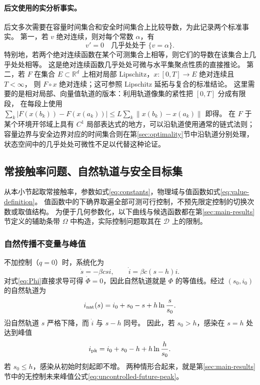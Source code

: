 \documentclass[11pt,a4paper,UTF8]{ctexart}
\theoremstyle{definition}
\newcommand{\R}{\mathbb R}
\newcommand{\Dcal}{\mathcal D}
\begin{document}
\paragraph{后文使用的实分析事实。}
后文多次需要在容量时间集合和安全时间集合上比较导数，为此记录两个标准事实。
第一，若 $v$ 绝对连续，则对每个常数 $\alpha$，有
\begin{equation}
 v'=0\quad\text{几乎处处于 }\{v=\alpha\}.
 \label{eq:ac-level-set}
\end{equation}
特别地，若两个绝对连续函数在某个可测集合上相等，则它们的导数在该集合上几乎处处相等。
这是绝对连续函数几乎处处可微与水平集聚点性质的直接推论\citep[\S222K、\S225C(b)]{Fremlin2001Volume2}。
第二，若 $F$ 在集合 $E\subset\R^d$ 上相对局部 Lipschitz，$x:[0,T]\to E$ 绝对连续且 $T<\infty$，
则 $F\circ x$ 绝对连续；这可参照 Lipschitz 延拓与复合的标准结论\citep[\S262B(b)、\S262X(l)]{Fremlin2001Volume2}。
这里需要的是相对局部、向量值轨道的版本：利用轨道像集的紧性把 $[0,T]$ 分成有限段，
在每段上使用 $\sum_k|F(x(b_k))-F(x(a_k))|\le L\sum_k\|x(b_k)-x(a_k)\|$ 即得。
在 $F$ 于某个环境开邻域上具有 $C^1$ 局部表达式的地方，可以沿轨道使用通常的链式法则；
容量边界与安全边界对应的时间集合则在第\ref{sec:optimality}节中沿轨道分别处理，状态空间中的几乎处处可微性不足以代替这种论证。


\subsection{常接触率问题、自然轨道与安全目标集}
\label{sec:constant-problem}
从本小节起取常接触率，参数如式\eqref{eq:constants}，物理域与值函数如式\eqref{eq:value-definition}。
值函数中的下确界取遍全部可测可行控制，不预先限定控制的切换次数或取值结构。
为便于几何参数化，以下曲线与候选函数都在第\ref{sec:main-results}节定义的辅助条带 $\Omega$ 中构造，实际控制问题取其在 $\Dcal$ 上的限制。

\subsubsection{自然传播不变量与峰值}
不加控制（$q=0$）时，系统化为
\begin{equation}
\dot s=-\beta csi,\qquad \dot i=\beta c(s-h)i.
\label{eq:q0-system}
\end{equation}
对式\eqref{eq:Phi}直接求导可得 $\dot\Phi=0$，因此自然轨道就是 $\Phi$ 的等值线。经过 $(s_0,i_0)$ 的自然轨道为
\begin{equation}
i_{\rm nat}(s)=i_0+s_0-s+h\ln\frac{s}{s_0}.
\label{eq:natural-orbit}
\end{equation}
沿自然轨道 $s$ 严格下降，而 $\dot i$ 与 $s-h$ 同号。
因此，若 $s_0>h$，感染在 $s=h$ 处达到峰值
\begin{equation}
i_{\rm pk}=i_0+s_0-h+h\ln\frac h{s_0}.
\label{eq:natural-peak}
\end{equation}
若 $s_0\le h$，感染从初始时刻起即不增。
两种情形合起来，就是第\ref{sec:main-results}节中的无控制未来峰值公式\eqref{eq:uncontrolled-future-peak}。
\end{document}
